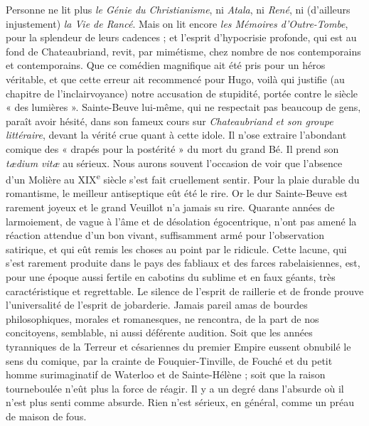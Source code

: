 \documentclass[french,twoside]{book} %
\begin{document}
Personne ne lit plus {\itshape le Génie du Christianisme}, ni {\itshape Atala}, ni {\itshape René}, ni (d’ailleurs injustement) {\itshape la Vie de Rancé}. Mais on lit encore {\itshape les Mémoires d’Outre-Tombe}, pour la splendeur de leurs cadences ; et l’esprit d’hypocrisie profonde, qui est au fond de Chateaubriand, revit, par mimétisme, chez nombre de nos contemporains et contemporains. Que ce comédien magnifique ait été pris pour un héros véritable, et que cette erreur ait recommencé pour Hugo, voilà qui justifie (au chapitre de l’inclairvoyance) notre accusation de stupidité, portée contre le siècle « des lumières ». Sainte-Beuve lui-même, qui ne respectait pas beaucoup de gens, paraît avoir hésité, dans son fameux cours sur {\itshape Chateaubriand et son groupe littéraire}, devant la vérité crue quant à cette idole. Il n’ose extraire l’abondant comique des « drapés pour la postérité » du mort du grand Bé. Il prend son {\itshape tædium vitæ} au sérieux. Nous aurons souvent l’occasion de voir que l’absence d’un Molière au XIX\textsuperscript{e} siècle s’est fait cruellement sentir. Pour la plaie durable du romantisme, le meilleur antiseptique eût été le rire. Or le dur Sainte-Beuve est rarement joyeux et le grand Veuillot n’a jamais su rire. Quarante années de larmoiement, de vague à l’âme et de désolation égocentrique, n’ont pas amené la réaction attendue d’un bon vivant, suffisamment armé pour l’observation satirique, et qui eût remis les choses au point par le ridicule. Cette lacune, qui s’est rarement produite dans le pays des fabliaux et des farces rabelaisiennes, est, pour une époque aussi fertile en cabotins du sublime et en faux géants, très caractéristique et regrettable. Le silence de l’esprit de raillerie et de fronde prouve l’universalité de l’esprit de jobarderie. Jamais pareil amas de bourdes philosophiques, morales et romanesques, ne rencontra, de la part de nos concitoyens, semblable, ni aussi déférente audition. Soit que les années tyranniques de la Terreur et césariennes du premier Empire eussent obnubilé le sens du comique, par la crainte de Fouquier-Tinville, de Fouché et du petit homme surimaginatif de Waterloo et de Sainte-Hélène ; soit que la raison tourneboulée n’eût plus la force de réagir. Il y a un degré dans l’absurde où il n’est plus senti comme absurde. Rien n’est sérieux, en général, comme un préau de maison de fous.\par
\end{document}
